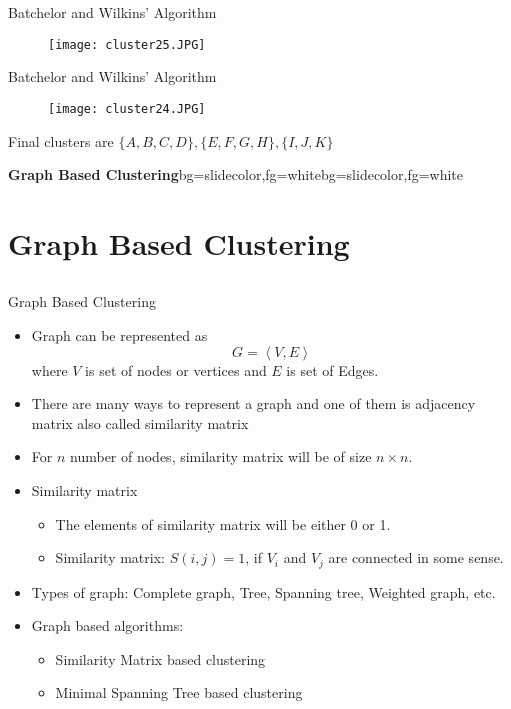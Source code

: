 \begin{frame}{Batchelor and Wilkins' Algorithm}
\begin{figure}
\texttt{[image: cluster25.JPG]}
\end{figure}
\end{frame}

\begin{frame}{Batchelor and Wilkins' Algorithm}
\begin{figure}
\texttt{[image: cluster24.JPG]}
\end{figure}
Final clusters are $\{A,B,C,D\},\{E,F,G,H\},\{I,J,K\}$
\end{frame}

\begin{frame}{}
\begin{variableblock}{\centering \Large \textbf{\vspace{4pt}\newline Graph Based Clustering\vspace{4pt}}}{bg=slidecolor,fg=white}{bg=slidecolor,fg=white}
\end{variableblock}
\end{frame}

\section{Graph Based Clustering}
\subsection{}
\begin{frame}{Graph Based Clustering}
\begin{itemize}
\item Graph can be represented as
\begin{equation}
G = \left\langle {V,E} \right\rangle \nonumber
\end{equation}
where $V$ is set of nodes or vertices and $E$ is set of Edges.
\item There are many ways to represent a graph and one of them is {\color{mycolor2}adjacency matrix} also called similarity matrix
\item For $n$ number of nodes, similarity matrix will be of size $n\times n$.
\item Similarity matrix
\begin{itemize}
\item The elements of similarity matrix will be either 0 or 1.
\item Similarity matrix: $S(i,j)=1$, if $V_i$ and $V_j$ are connected in some sense.
\end{itemize}
 
\item Types of graph: Complete graph, Tree, Spanning tree, Weighted graph, etc.
\item Graph based algorithms:
\begin{itemize}
\item Similarity Matrix based clustering
\item Minimal Spanning Tree based clustering
\end{itemize}
\end{itemize}
\end{frame}



